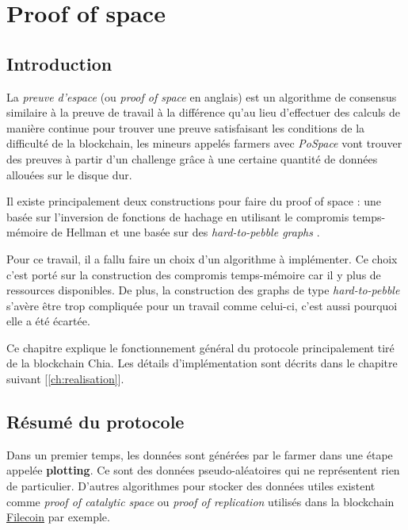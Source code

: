 \documentclass[../tb_report.tex]{subfiles}
\begin{document}
\chapter{Proof of space}
\label{ch:pospace}

\section{Introduction}

La \emph{preuve d'espace} (ou \emph{proof of space} en anglais) est un algorithme de consensus similaire à la preuve de travail à la différence qu'au lieu d'effectuer des calculs de manière continue pour trouver une preuve satisfaisant les conditions de la difficulté de la blockchain, les mineurs appelés farmers avec \emph{PoSpace} vont trouver des preuves à partir d'un challenge grâce à une certaine quantité de données allouées sur le disque dur. 

Il existe principalement deux constructions pour faire du proof of space : une basée sur l'inversion de fonctions de hachage en utilisant le compromis temps-mémoire de Hellman \cite{DBLP:conf/asiacrypt/AbusalahACKPR17} et une basée sur des \emph{hard-to-pebble graphs} \cite{DBLP:conf/crypto/DziembowskiFKP15}.

Pour ce travail, il a fallu faire un choix d'un algorithme à implémenter. Ce choix c'est porté sur la construction des compromis temps-mémoire car il y plus de ressources disponibles. De plus, la construction des graphs de type \emph{hard-to-pebble} s'avère être trop compliquée pour un travail comme celui-ci, c'est aussi pourquoi elle a été écartée.

Ce chapitre explique le fonctionnement général du protocole principalement tiré de la blockchain Chia. Les détails d'implémentation sont décrits dans le chapitre suivant [\ref{ch:realisation}].

\section{Résumé du protocole}

Dans un premier temps, les données sont générées par le farmer dans une étape appelée \textbf{plotting}. Ce sont des données pseudo-aléatoires qui ne représentent rien de particulier. D'autres algorithmes pour stocker des données utiles existent comme \emph{proof of catalytic space} ou \emph{proof of replication} utilisés dans la blockchain \href{https://filecoin.io/}{Filecoin} par exemple.
\end{document}
